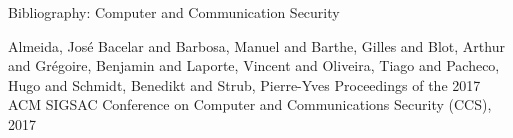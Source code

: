 \documentclass{beamer}
\begin{document}
	
	\begin{frame}{Bibliography: Computer and Communication Security}
		\begin{thebibliography}{10}
			\beamertemplatearticlebibitems
		
		Almeida, Jos\'{e} Bacelar and Barbosa, Manuel and Barthe, Gilles and Blot, Arthur and Gr\'{e}goire, Benjamin and Laporte, Vincent and Oliveira, Tiago and Pacheco, Hugo and Schmidt, Benedikt and Strub, Pierre-Yves
			\newblock {}
			\newblock Proceedings of the 2017 ACM SIGSAC Conference on Computer and Communications Security (CCS), 2017
		\end{thebibliography}
	 \end{frame}
	 
	
	 
		
		
	
\end{document}
